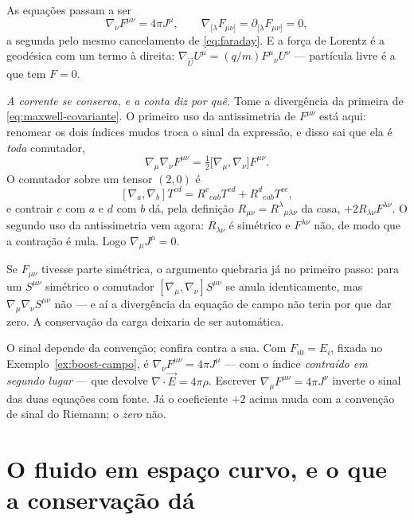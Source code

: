 \documentclass[12pt,a4paper,oneside]{book}
\theoremstyle{rgplain}
\theoremstyle{rgremark}
\begin{document}
As equações passam a ser
\begin{equation}
  \nabla_\nu F^{\mu\nu}=4\pi J^\mu ,
  \qquad
  \nabla_{[\lambda}F_{\mu\nu]}=\partial_{[\lambda}F_{\mu\nu]}=0 ,
  \label{eq:maxwell-covariante}
\end{equation}
a segunda pelo mesmo cancelamento de \eqref{eq:faraday}. E a força de Lorentz
é a geodésica com um termo à direita:
$\nabla_{\vec U}U^\mu=(q/m)F^\mu{}_\nu U^\nu$ --- partícula livre é a que tem
$F=0$.

\emph{A corrente se conserva, e a conta diz por quê.} Tome a
divergência da primeira de \eqref{eq:maxwell-covariante}. O primeiro uso da
antissimetria de $F^{\mu\nu}$ está aqui: renomear os dois índices mudos troca
o sinal da expressão, e disso sai que ela é \emph{toda} comutador,
\[
  \nabla_\mu\nabla_\nu F^{\mu\nu}
  =\tfrac12\bigl[\nabla_\mu,\nabla_\nu\bigr]F^{\mu\nu} .
\]
O comutador sobre um tensor $(2,0)$ é
\[
  [\nabla_a,\nabla_b]T^{cd}
  =R^c{}_{eab}T^{ed}+R^d{}_{eab}T^{ce} ,
\]
e contrair $c$ com $a$ e $d$ com $b$ dá, pela definição
$R_{\mu\nu}=R^\lambda{}_{\mu\lambda\nu}$ da casa,
$+2R_{\lambda\nu}F^{\lambda\nu}$. O segundo uso da antissimetria vem agora:
$R_{\lambda\nu}$ é simétrico e $F^{\lambda\nu}$ não, de modo que a contração é
nula. Logo $\nabla_\mu J^\mu=0$.

Se $F_{\mu\nu}$ tivesse parte simétrica, o argumento quebraria já no
primeiro passo: para um $S^{\mu\nu}$ simétrico o comutador
$[\nabla_\mu,\nabla_\nu]S^{\mu\nu}$ se anula identicamente, mas
$\nabla_\mu\nabla_\nu S^{\mu\nu}$ não --- e aí a divergência da equação de
campo não teria por que dar zero. A conservação da carga deixaria de ser
automática.

\begin{atencao}
O sinal depende da convenção; confira contra a sua. Com
$F_{i0}=E_i$, fixada no Exemplo~\ref{ex:boost-campo}, é
$\nabla_\nu F^{\mu\nu}=4\pi J^\mu$ --- com o índice \emph{contraído em
segundo lugar} --- que devolve $\nabla\cdot\vec E=4\pi\rho$. Escrever
$\nabla_\mu F^{\mu\nu}=4\pi J^\nu$ inverte o sinal das duas equações com
fonte. Já o coeficiente $+2$ acima muda com a convenção de sinal do Riemann;
o \emph{zero} não.
\end{atencao}

\section{O fluido em espaço curvo, e o que a conservação dá}
\label{sec:fluido-curvo}
\end{document}
